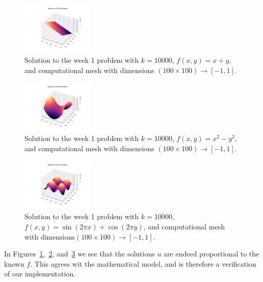\documentclass[acmtog]{acmart}
\begin{document}
\begin{figure}[H]
  \centering
  \includegraphics[width=0.3\textwidth]{Images/plane_sol.png}
  \caption{Solution to the week 1 problem with $k=10000$, $f(x,y) = x + y$, and computational mesh with dimensions $(100 \times 100) \to [-1, 1]$.\label{fig:plane}}
\end{figure}
\begin{figure}[H]
  \centering
  \includegraphics[width=0.3\textwidth]{Images/quad_sol.png}
  \caption{Solution to the week 1 problem with $k=10000$, $f(x,y) = x^2 - y^2$, and computational mesh with dimensions $(100 \times 100) \to [-1, 1]$.\label{fig:saddle}}
\end{figure}
\begin{figure}[H]
  \centering
  \includegraphics[width=0.3\textwidth]{Images/wave_sol.png}
  \caption{Solution to the week 1 problem with $k=10000$, $f(x,y) = \sin(2\pi x) + \cos(2\pi y)$, and computational mesh with dimensions$(100 \times 100) \to [-1, 1]$.\label{fig:wave}}
\end{figure}

In Figures~\ref{fig:plane},~\ref{fig:saddle}, and~\ref{fig:wave} we see that
the solutions $u$ are endeed proportional to the known $f$. This agrees wit the
mathematical model, and is therefore a verification of our implementation.
\end{document}
